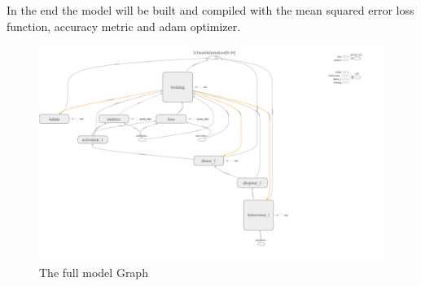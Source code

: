 In the end the model will be built and compiled with the mean  squared error loss function, accuracy metric and adam optimizer.

\begin{figure}[htp]
	\centering
	\includegraphics[width=1\textwidth]{Illustrations/tensorboard model of NN.png}
	\caption{The full model Graph}
	\label{fig:FullmodelGraph}
\end{figure}





